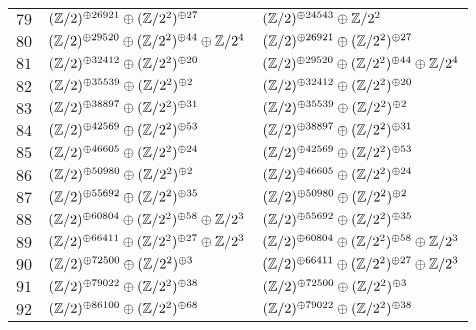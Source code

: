 \begin{supertabular}{|c|p{5.5cm}|p{5.5cm}|}
$79$%
&$(\mathbb{Z}/2)^{\oplus26921}\oplus(\mathbb{Z}/2^{2})^{\oplus27}$%
&$(\mathbb{Z}/2)^{\oplus24543}\oplus\mathbb{Z}/2^{2}$\\

$80$%
&$(\mathbb{Z}/2)^{\oplus29520}\oplus(\mathbb{Z}/2^{2})^{\oplus44}\oplus\mathbb{Z}/2^{4}$%
&$(\mathbb{Z}/2)^{\oplus26921}\oplus(\mathbb{Z}/2^{2})^{\oplus27}$\\

$81$%
&$(\mathbb{Z}/2)^{\oplus32412}\oplus(\mathbb{Z}/2^{2})^{\oplus20}$%
&$(\mathbb{Z}/2)^{\oplus29520}\oplus(\mathbb{Z}/2^{2})^{\oplus44}\oplus\mathbb{Z}/2^{4}$\\

$82$%
&$(\mathbb{Z}/2)^{\oplus35539}\oplus(\mathbb{Z}/2^{2})^{\oplus2}$%
&$(\mathbb{Z}/2)^{\oplus32412}\oplus(\mathbb{Z}/2^{2})^{\oplus20}$\\

$83$%
&$(\mathbb{Z}/2)^{\oplus38897}\oplus(\mathbb{Z}/2^{2})^{\oplus31}$%
&$(\mathbb{Z}/2)^{\oplus35539}\oplus(\mathbb{Z}/2^{2})^{\oplus2}$\\

$84$%
&$(\mathbb{Z}/2)^{\oplus42569}\oplus(\mathbb{Z}/2^{2})^{\oplus53}$%
&$(\mathbb{Z}/2)^{\oplus38897}\oplus(\mathbb{Z}/2^{2})^{\oplus31}$\\

$85$%
&$(\mathbb{Z}/2)^{\oplus46605}\oplus(\mathbb{Z}/2^{2})^{\oplus24}$%
&$(\mathbb{Z}/2)^{\oplus42569}\oplus(\mathbb{Z}/2^{2})^{\oplus53}$\\

$86$%
&$(\mathbb{Z}/2)^{\oplus50980}\oplus(\mathbb{Z}/2^{2})^{\oplus2}$%
&$(\mathbb{Z}/2)^{\oplus46605}\oplus(\mathbb{Z}/2^{2})^{\oplus24}$\\

$87$%
&$(\mathbb{Z}/2)^{\oplus55692}\oplus(\mathbb{Z}/2^{2})^{\oplus35}$%
&$(\mathbb{Z}/2)^{\oplus50980}\oplus(\mathbb{Z}/2^{2})^{\oplus2}$\\

$88$%
&$(\mathbb{Z}/2)^{\oplus60804}\oplus(\mathbb{Z}/2^{2})^{\oplus58}\oplus\mathbb{Z}/2^{3}$%
&$(\mathbb{Z}/2)^{\oplus55692}\oplus(\mathbb{Z}/2^{2})^{\oplus35}$\\

$89$%
&$(\mathbb{Z}/2)^{\oplus66411}\oplus(\mathbb{Z}/2^{2})^{\oplus27}\oplus\mathbb{Z}/2^{3}$%
&$(\mathbb{Z}/2)^{\oplus60804}\oplus(\mathbb{Z}/2^{2})^{\oplus58}\oplus\mathbb{Z}/2^{3}$\\

$90$%
&$(\mathbb{Z}/2)^{\oplus72500}\oplus(\mathbb{Z}/2^{2})^{\oplus3}$%
&$(\mathbb{Z}/2)^{\oplus66411}\oplus(\mathbb{Z}/2^{2})^{\oplus27}\oplus\mathbb{Z}/2^{3}$\\

$91$%
&$(\mathbb{Z}/2)^{\oplus79022}\oplus(\mathbb{Z}/2^{2})^{\oplus38}$%
&$(\mathbb{Z}/2)^{\oplus72500}\oplus(\mathbb{Z}/2^{2})^{\oplus3}$\\

$92$%
&$(\mathbb{Z}/2)^{\oplus86100}\oplus(\mathbb{Z}/2^{2})^{\oplus68}$%
&$(\mathbb{Z}/2)^{\oplus79022}\oplus(\mathbb{Z}/2^{2})^{\oplus38}$\\


\end{supertabular}
